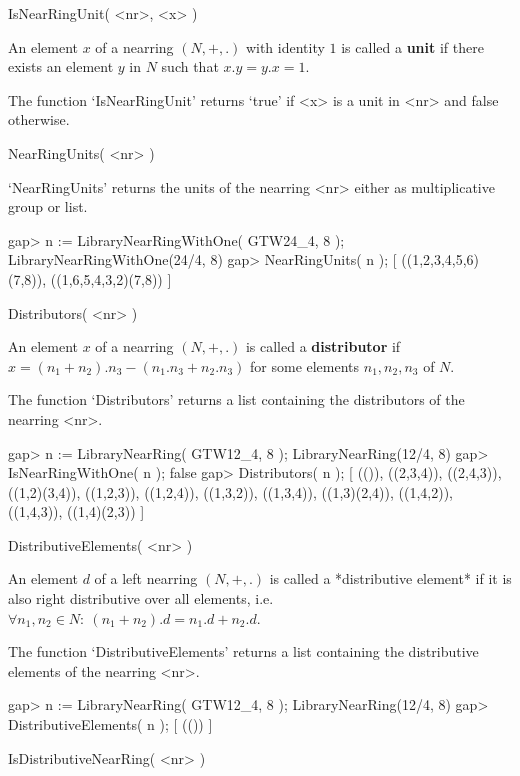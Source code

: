 
\>IsNearRingUnit( <nr>, <x> )

An element $x$ of a nearring $(N,+,.)$ with identity $1$ is called a {\bf unit}
if there exists an element $y$ in $N$ such that $x.y = y.x = 1$.

The function `IsNearRingUnit' returns `true' if <x> is a unit in <nr> and
false otherwise.

\>NearRingUnits( <nr> )

`NearRingUnits' returns the units of the nearring <nr> either as
 multiplicative group or list.

\beginexample
    gap> n := LibraryNearRingWithOne( GTW24_4, 8 );
    LibraryNearRingWithOne(24/4, 8)
    gap> NearRingUnits( n );    
    [ ((1,2,3,4,5,6)(7,8)), ((1,6,5,4,3,2)(7,8)) ]
\endexample



\>Distributors( <nr> )

An element $x$ of a nearring $(N,+,.)$ is called a {\bf distributor}
if $x = (n_1 + n_2 ) . n_3 - (n_1 . n_3 + n_2 . n_3 )$ for some elements
$n_1, n_2, n_3$ of $N$.

The function `Distributors' returns a list containing the distributors 
of the nearring <nr>. 

\beginexample
    gap> n := LibraryNearRing( GTW12_4, 8 );             
    LibraryNearRing(12/4, 8)
    gap> IsNearRingWithOne( n );
    false
    gap> Distributors( n );
    [ (()), ((2,3,4)), ((2,4,3)), ((1,2)(3,4)), ((1,2,3)), ((1,2,4)), 
      ((1,3,2)), ((1,3,4)), ((1,3)(2,4)), ((1,4,2)), ((1,4,3)), 
      ((1,4)(2,3)) ]
\endexample

\>DistributiveElements( <nr> )

An element $d$ of a left nearring $(N,+,.)$ is called a 
*distributive element* if it is also right distributive over all elements,
i.e. $\forall n_1, n_2 \in N:\ (n_1 + n_2 ).d = n_1.d + n_2.d$. 

The function `DistributiveElements' returns a list containing the 
distributive elements of the nearring <nr>. 

\beginexample
    gap> n := LibraryNearRing( GTW12_4, 8 );            
    LibraryNearRing(12/4, 8)
    gap> DistributiveElements( n );
    [ (()) ]
\endexample

\>IsDistributiveNearRing( <nr> )

